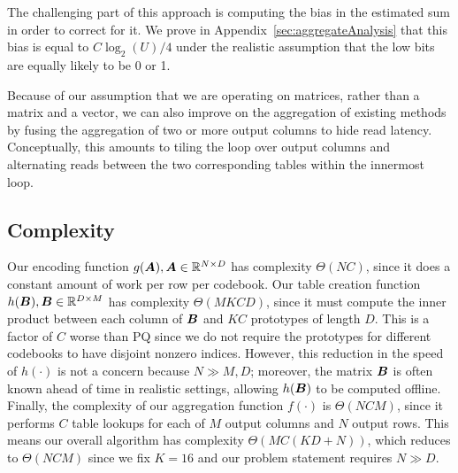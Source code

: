 The challenging part of this approach is computing the bias in the estimated sum in order to correct for it. We prove in Appendix~\ref{sec:aggregateAnalysis} that this bias is equal to $C \log_2(U) / 4$ under the realistic assumption that the low bits are equally likely to be 0 or 1.

Because of our assumption that we are operating on matrices, rather than a matrix and a vector, we can also improve on the aggregation of existing methods \cite{bolt, quickAdc, quickerAdc} by fusing the aggregation of two or more output columns to hide read latency. Conceptually, this amounts to tiling the loop over output columns and alternating reads between the two corresponding tables within the innermost loop. %

\vspace{-1.5mm}
\subsection{Complexity}
\vspace{-.5mm}


Our encoding function $g(\bm{A}), \bm{A} \in \mathbb{R}^{N \times D}$ has complexity $\Theta(NC)$, since it does a constant amount of work per row per codebook. Our table creation function $h(\bm{B}), \bm{B} \in \mathbb{R}^{D \times M}$ has complexity $\Theta(MKCD)$, since it must compute the inner product between each column of $\bm{B}$ and $KC$ prototypes of length $D$. This is a factor of $C$ worse than PQ since we do not require the prototypes for different codebooks to have disjoint nonzero indices. However, this reduction in the speed of $h(\cdot)$ is not a concern because $N \gg M, D$; moreover, the matrix $\bm{B}$ is often known ahead of time in realistic settings, allowing $h(\bm{B})$ to be computed offline. Finally, the complexity of our aggregation function $f(\cdot)$ is $\Theta(NCM)$, since it performs $C$ table lookups for each of $M$ output columns and $N$ output rows. This means our overall algorithm has complexity $\Theta(MC(KD + N))$, which reduces to $\Theta(NCM)$ since we fix $K = 16$ and our problem statement requires $N \gg D$.

